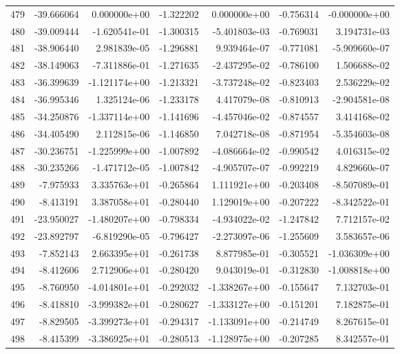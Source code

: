 \begin{tabular}{rrrrrrr}
 479 & -39.666064 &  0.000000e+00 & -1.322202 &  0.000000e+00 &   -0.756314 & -0.000000e+00 \\
 480 & -39.009444 & -1.620541e-01 & -1.300315 & -5.401803e-03 &   -0.769031 &  3.194731e-03 \\
 481 & -38.906440 &  2.981839e-05 & -1.296881 &  9.939464e-07 &   -0.771081 & -5.909660e-07 \\
 482 & -38.149063 & -7.311886e-01 & -1.271635 & -2.437295e-02 &   -0.786100 &  1.506688e-02 \\
 483 & -36.399639 & -1.121174e+00 & -1.213321 & -3.737248e-02 &   -0.823403 &  2.536229e-02 \\
 484 & -36.995346 &  1.325124e-06 & -1.233178 &  4.417079e-08 &   -0.810913 & -2.904581e-08 \\
 485 & -34.250876 & -1.337114e+00 & -1.141696 & -4.457046e-02 &   -0.874557 &  3.414168e-02 \\
 486 & -34.405490 &  2.112815e-06 & -1.146850 &  7.042718e-08 &   -0.871954 & -5.354603e-08 \\
 487 & -30.236751 & -1.225999e+00 & -1.007892 & -4.086664e-02 &   -0.990542 &  4.016315e-02 \\
 488 & -30.235266 & -1.471712e-05 & -1.007842 & -4.905707e-07 &   -0.992219 &  4.829660e-07 \\
 489 &  -7.975933 &  3.335763e+01 & -0.265864 &  1.111921e+00 &   -0.203408 & -8.507089e-01 \\
 490 &  -8.413191 &  3.387058e+01 & -0.280440 &  1.129019e+00 &   -0.207222 & -8.342522e-01 \\
 491 & -23.950027 & -1.480207e+00 & -0.798334 & -4.934022e-02 &   -1.247842 &  7.712157e-02 \\
 492 & -23.892797 & -6.819290e-05 & -0.796427 & -2.273097e-06 &   -1.255609 &  3.583657e-06 \\
 493 &  -7.852143 &  2.663395e+01 & -0.261738 &  8.877985e-01 &   -0.305521 & -1.036309e+00 \\
 494 &  -8.412606 &  2.712906e+01 & -0.280420 &  9.043019e-01 &   -0.312830 & -1.008818e+00 \\
 495 &  -8.760950 & -4.014801e+01 & -0.292032 & -1.338267e+00 &   -0.155647 &  7.132703e-01 \\
 496 &  -8.418810 & -3.999382e+01 & -0.280627 & -1.333127e+00 &   -0.151201 &  7.182875e-01 \\
 497 &  -8.829505 & -3.399273e+01 & -0.294317 & -1.133091e+00 &   -0.214749 &  8.267615e-01 \\
 498 &  -8.415399 & -3.386925e+01 & -0.280513 & -1.128975e+00 &   -0.207285 &  8.342557e-01 \\

\end{tabular}
